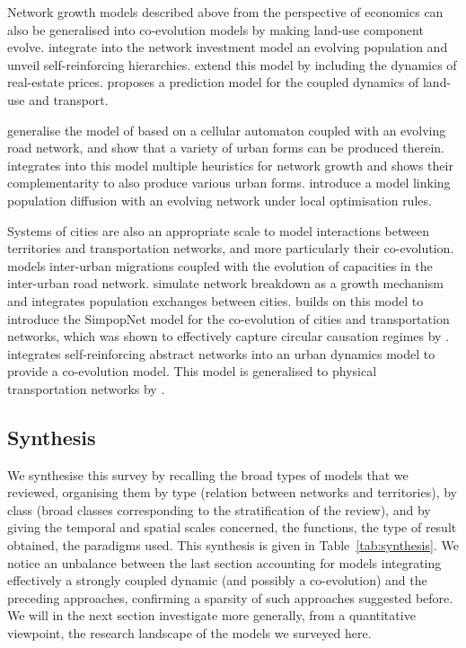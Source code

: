 \documentclass[10pt]{article}
\begin{document}
Network growth models described above from the perspective of economics can also be generalised into co-evolution models by making land-use component evolve. \cite{levinson2007co} integrate into the network investment model an evolving population and unveil self-reinforcing hierarchies. \cite{li2016integrated} extend this model by including the dynamics of real-estate prices. \cite{levinson2005paving} proposes a prediction model for the coupled dynamics of land-use and transport. 

\cite{raimbault2014hybrid} generalise the model of \cite{moreno2012automate} based on a cellular automaton coupled with an evolving road network, and show that a variety of urban forms can be produced therein. \cite{raimbault2019urban} integrates into this model multiple heuristics for network growth and shows their complementarity to also produce various urban forms. \cite{wu2017city} introduce a model linking population diffusion with an evolving network under local optimisation rules.

Systems of cities are also an appropriate scale to model interactions between territories and transportation networks, and more particularly their co-evolution. \cite{baptiste1999interactions} models inter-urban migrations coupled with the evolution of capacities in the inter-urban road network. \cite{blumenfeld2010network} simulate network breakdown as a growth mechanism and integrates population exchanges between cities. \cite{schmitt2014modelisation} builds on this model to introduce the SimpopNet model for the co-evolution of cities and transportation networks, which was shown to effectively capture circular causation regimes by \cite{raimbault2020unveiling}. \cite{raimbault2018modeling} integrates self-reinforcing abstract networks into an urban dynamics model to provide a co-evolution model. This model is generalised to physical transportation networks by \cite{raimbault2020hierarchy}.



\subsection{Synthesis}

We synthesise this survey by recalling the broad types of models that we reviewed, organising them by type (relation between networks and territories), by class (broad classes corresponding to the stratification of the review), and by giving the temporal and spatial scales concerned, the functions, the type of result obtained, the paradigms used. This synthesis is given in Table~\ref{tab:synthesis}. We notice an unbalance between the last section accounting for models integrating effectively a strongly coupled dynamic (and possibly a co-evolution) and the preceding approaches, confirming a sparsity of such approaches suggested before. We will in the next section investigate more generally, from a quantitative viewpoint, the research landscape of the models we surveyed here.
\end{document}
